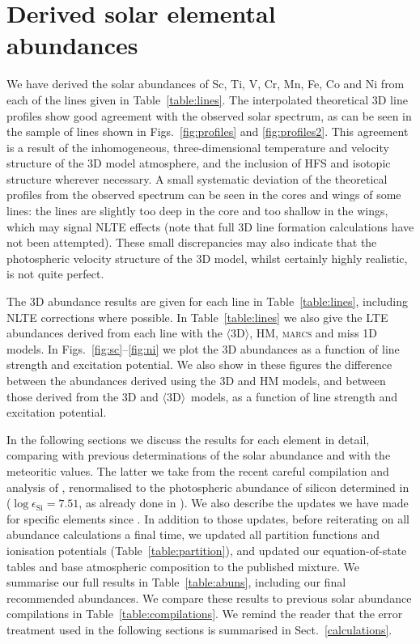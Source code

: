 \documentclass[traditabstract]{aa}
\newcommand{\oneDAV}{$\langle\mathrm{3D}\rangle$}
\begin{document}
\section{Derived solar elemental abundances}
\label{results}

We have derived the solar abundances of Sc, Ti, V, Cr, Mn, Fe, Co and Ni from each of the lines given in Table~\ref{table:lines}.  The interpolated theoretical 3D line profiles show good agreement with the observed solar spectrum, as can be seen in the sample of lines shown in Figs.~\ref{fig:profiles} and \ref{fig:profiles2}.  This agreement is a result of the inhomogeneous, three-dimensional temperature and velocity structure of the 3D model atmosphere, and the inclusion of HFS and isotopic structure wherever necessary.  A small systematic deviation of the theoretical profiles from the observed spectrum can be seen in the cores and wings of some lines: the lines are slightly too deep in the core and too shallow in the wings, which may signal NLTE effects (note that full 3D line formation calculations have not been attempted). These small discrepancies may also indicate that the photospheric velocity structure of the 3D model, whilst certainly highly realistic, is not quite perfect.

The 3D abundance results are given for each line in Table~\ref{table:lines}, including NLTE corrections where possible.  In Table~\ref{table:lines} we also give the LTE abundances derived from each line with the \oneDAV, HM, \textsc{marcs} and {\sc miss} 1D models.  In Figs.~\ref{fig:sc}--\ref{fig:ni} we plot the 3D abundances as a function of line strength and excitation potential.  We also show in these figures the difference between the abundances derived using the 3D and HM models, and between those derived from the 3D and \oneDAV\ models, as a function of line strength and excitation potential.  

In the following sections we discuss the results for each element in detail, comparing with previous determinations of the solar abundance and with the meteoritic values.  The latter we take from the recent careful compilation and analysis of \citet{Lodders09}, renormalised to the photospheric abundance of silicon determined in  ($\log\epsilon_\mathrm{Si}=7.51$, as already done in ).  We also describe the updates we have made for specific elements since .  In addition to those updates, before reiterating on all abundance calculations a final time, we updated all partition functions and ionisation potentials (Table~\ref{table:partition}), and updated our equation-of-state tables and base atmospheric composition to the published  mixture.  We summarise our full results in Table~\ref{table:abuns}, including our final recommended abundances.  We compare these results to previous solar abundance compilations in Table~\ref{table:compilations}.  We remind the reader that the error treatment used in the following sections is summarised in Sect.\ \ref{calculations}.
\end{document}
